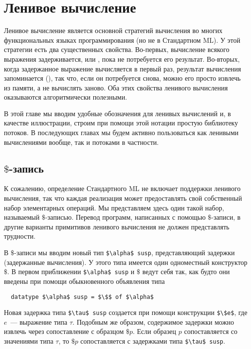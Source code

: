 \chapter{Ленивое вычисление}
\label{ch:4}

Ленивое вычисление является основной стратегий вычисления во многих
функциональных языках программирования (но не в Стандартном ML). У
этой стратегии есть два существенных свойства. Во-первых, вычисление
всякого выражения задерживается, или ,
пока не потребуется его результат. Во-вторых, когда задержанное
выражение вычисляется в первый раз, результат вычисления запоминается
(), так что, если он потребуется снова,
можно его просто извлечь из памяти, а не вычислять заново. Оба этих свойства
ленивого вычисления оказываются алгоритмически полезными.

В этой главе мы вводим удобные обозначения для ленивых вычислений и, в
качестве иллюстрации, строим при помощи этой нотации простую
библиотеку потоков. В последующих главах мы будем активно пользоваться
как ленивыми вычислениями вообще, так и потоками в частности.

\section{$\$$-запись}
\label{sc:4-1}

К сожалению, определение Стандартного ML \cite{Milner-etal1997} не
включает поддержки ленивого вычисления, так что каждая реализация
может предоставлять свой собственный набор элементарных операций.
Мы представляем здесь один такой набор,
называемый $\$$-записью.  Перевод программ, написанных с помощью
$\$$-записи, в другие варианты примитивов ленивого вычисления не
должен представлять трудности.

В $\$$-записи мы вводим новый тип \lstinline!$\alpha$ susp!,
представляющий задержки (задержанные вычисления). У этого типа имеется один
одноместный конструктор $\$$. В первом приближении 
\lstinline!$\alpha$ susp! и $\$$ ведут себя так, как будто они введены при помощи
обыкновенного объявления типа
\begin{lstlisting}
  datatype $\alpha$ susp = $\$$ of $\alpha$
\end{lstlisting}
Новая задержка типа \lstinline!$\tau$ susp! создается
при помощи конструкции \lstinline!$\$e$!, где $e$~---
выражение типа $\tau$. Подобным же образом, содержимое задержки можно
извлечь через сопоставление с образцом
$\$p$. Если образец $p$ сопоставляется со значениями типа $\tau$, то
$\$p$ сопоставляется с задержками типа
\lstinline!$\tau$ susp!.

